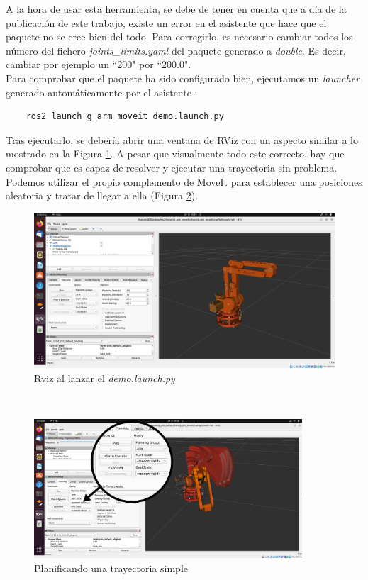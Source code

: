 A la hora de usar esta herramienta, se debe de tener en cuenta que a día de la publicación de este trabajo, existe un error en el asistente
que hace que el paquete no se cree bien del todo. Para corregirlo, es necesario cambiar todos los número del fichero \textit{joints\_limits.yaml}
del paquete generado a \textit{double}. Es decir, cambiar por ejemplo un ``200" por ``200.0".
\\
\newpage
Para comprobar que el paquete ha sido configurado bien, ejecutamos un \textit{launcher} generado automáticamente por el asistente :
\begin{verbatim}
    ros2 launch g_arm_moveit demo.launch.py
\end{verbatim}
Tras ejecutarlo, se debería abrir una ventana de RViz con un aspecto similar a lo mostrado en la Figura \ref{fig:moveit_demo}. A pesar que 
visualmente todo este correcto, hay que comprobar que es capaz de resolver y ejecutar una trayectoria sin problema. Podemos utilizar 
el propio complemento de MoveIt para establecer una posiciones aleatoria y tratar de llegar a ella (Figura \ref{fig:moveit_trayectory_demo}).
\begin{figure} [ht!]
    \begin{center}
      \includegraphics[width=14cm]{figs/moveit_demo.png}
    \end{center}
    \caption{Rviz al lanzar el \textit{demo.launch.py}}
    \label{fig:moveit_demo}
\end{figure}\ 

\begin{figure} [ht!]
    \begin{center}
      \includegraphics[width=10cm]{figs/moveit_demo_trajectory.png}
    \end{center}
    \caption{Planificando una trayectoria simple}
    \label{fig:moveit_trayectory_demo}
\end{figure}\ 

